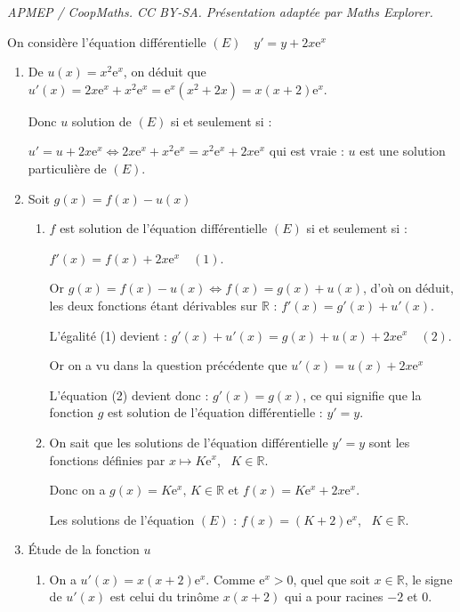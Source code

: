 \documentclass[10pt]{article}
\providecommand{\R}{\mathbb{R}}
\providecommand{\e}{{\mathrm{e}}}
\begin{document}
\noindent\textit{APMEP / CoopMaths. CC BY-SA. Présentation adaptée par Maths Explorer.}\par\medskip
\vspace{0.5cm}










On considère l’équation différentielle  $(E)\quad  y'=  y+ 2 x \e^x$
 

\smallskip

\begin{enumerate}
\item 
De $u(x) = x^2\e^x$, on déduit que $u'(x) = 2x\e^x +  x^2\e^x =  \e^x\left(x^2 + 2x \right) = x(x + 2)\e^x$.

Donc $u$ solution de $(E)$ si et seulement si :

$u' = u + 2x\e^x \iff 2x\e^x +  x^2\e^x = x^2\e^x + 2 x \e^x$ qui est vraie : $u$ est 
une solution particulière de $(E)$.
\item Soit $g(x)=f(x) - u(x)$



\smallskip

\begin{enumerate}
\item  
$f$ est solution de l'équation différentielle $(E)$ si et seulement si :

$f'(x) = f(x) + 2x\e^x \quad (1)$.

Or $g(x) = f(x) - u(x) \iff f(x) = g(x) + u(x)$, d'où on déduit, les deux fonctions étant dérivables sur $\R$ : $f'(x) = g'(x) + u'(x)$.

L'égalité (1) devient : $g'(x) + u'(x) = g(x) + u(x) + 2x\e^x \quad (2)$.

Or on a vu dans la question précédente que $u'(x) = u(x) + 2x\e^x$

L'équation (2) devient donc : $g'(x) = g(x)$, ce qui signifie que la fonction $g$ est solution de l'équation différentielle : $y' = y$.



\item 
On sait que les solutions de l'équation différentielle $y' = y$ sont les fonctions définies par $x \longmapsto K\e^x$, \, $K \in \R$.

Donc on a $g(x) = K \e^x, \, K \in \R$ et $f(x) = K \e^x + 2x\e^x$.

Les solutions de l'équation $(E)$ : $f(x) = (K + 2)\e^x$, \, $K \in \R$.
\end{enumerate}
\item Étude de la fonction $u $
	\begin{enumerate}
		\item 
On a $u'(x) = x(x + 2)\e^x$. Comme $\e^x > 0$, quel que soit $x \in \R$, le signe de $u'(x)$ est celui du trinôme $x(x + 2)$ qui a pour racines $- 2$ et $0$.


\end{enumerate}
\end{enumerate}
\end{document}
